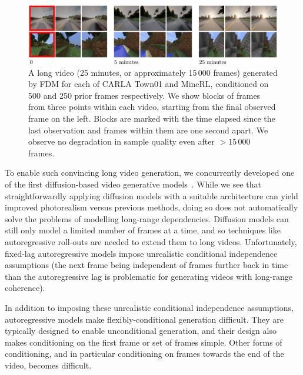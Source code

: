 \begin{figure}[t]
    \centering
    \includegraphics[width=\textwidth]{figs/fdm/fig1.pdf}
    \caption{A long video (25 minutes, or approximately 15\,000 frames) generated by FDM for each of CARLA Town01 and MineRL, conditioned on 500 and 250 prior frames respectively. We show blocks of frames from three points within each video, starting from the final observed frame on the left. Blocks are marked with the time elapsed since the last observation and frames within them are one second apart. We observe no degradation in sample quality even after $>15\,000$ frames.}
    \label{fig:fdm-1}
\end{figure}

To enable such convincing long video generation, 
we concurrently developed one of the first diffusion-based video generative models~\cite{ho2022video,yang2022diffusion,voleti2022mcvd}. While we see that straightforwardly applying diffusion models with a suitable architecture can yield improved photorealism versus previous methods, doing so does not automatically solve the problems of modelling long-range dependencies. Diffusion models can still only model a limited number of frames at a time, and so techniques like autoregressive roll-outs are needed to extend them to long videos. Unfortunately, fixed-lag autoregressive models impose unrealistic conditional independence assumptions (the next frame being independent of frames further back in time than the autoregressive lag is problematic for generating videos with long-range coherence).  

In addition to imposing these unrealistic conditional independence assumptions, autoregressive models make flexibly-conditional generation difficult. They are typically designed to enable unconditional generation, and their design also makes conditioning on the first frame or set of frames simple. Other forms of conditioning, and in particular conditioning on frames towards the end of the video, becomes difficult.

